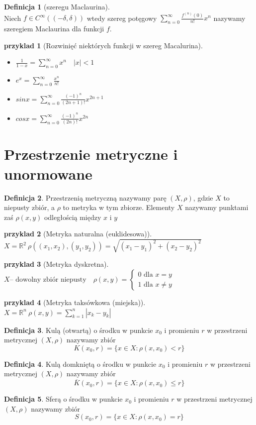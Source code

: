 \documentclass[12pt,a4paper]{article}
\newtheorem{przyklad}{przyklad}
\theoremstyle{definition}
\newtheorem{df}{Definicja}
\begin{document}
\begin{df}[szeregu Maclaurina]~\\
Niech $f\in C^\infty ((-\delta, \delta))$ wtedy szereg potęgowy $\sum\limits_{n=0}^\infty \frac{f^{(n)}(0)}{n!}x^n$ nazywamy szeregiem Maclaurina dla funkcji $f$.
\end{df}

\begin{przyklad}[Rozwinięć niektórych funkcji w szereg Macalurina]~\\
\begin{itemize}
	\item $\frac{1}{1-x} = \sum\limits_{n=0}^\infty x^n \quad |x| < 1$
	\item $e^x = \sum\limits_{n=0}^\infty \frac{x^n}{n!}$
	\item $sinx = \sum\limits_{n=0}^\infty \frac{(-1)^n}{(2n+1)!}x^{2n+1}$
	\item $cosx = \sum\limits_{n=0}^\infty \frac{(-1)^n}{(2n)!}x^{2n}$
\end{itemize}
\end{przyklad}

\section{Przestrzenie metryczne i unormowane}
\begin{df}
Przestrzenią metryczną nazywamy parę $(X, \rho)$, gdzie $X$ to niepusty zbiór, a $\rho$ to metryka w tym zbiorze. Elementy $X$ nazywamy punktami zaś $\rho (x,y)$ odległością między $x$ i $y$ 
\end{df}
\begin{przyklad}[Metryka naturalna (euklidesowa)]
$X = \mathbb{R}^2 ~\rho((x_1,x_2),(y_1, y_2)) = \sqrt{(x_1-y_1)^2+(x_2-y_2)^2}$
\end{przyklad}
\begin{przyklad}[Metryka dyskretna]
$X \text{-- dowolny zbiór niepusty} \quad \rho(x,y) = 
\begin{cases}
0 \text{ dla } x = y\\
1 \text{ dla } x \neq y
\end{cases}$
\end{przyklad}
\begin{przyklad}[Metryka taksówkowa (miejska)]
$X = \mathbb{R}^n ~\rho(x, y) = \sum\limits_{k=1}^n |x_k-y_k|$
\end{przyklad}

\begin{df}
Kulą (otwartą) o środku w punkcie $x_0$ i promieniu $r$ w przestrzeni metrycznej $(X, \rho)$ nazywamy zbiór $$K(x_0, r) = \{x\in X: \rho(x,x_0) < r\}$$
\end{df}
\begin{df}
Kulą domkniętą o środku w punkcie $x_0$ i promieniu $r$ w przestrzeni metrycznej $(X, \rho)$ nazywamy zbiór $$\overline{K}(x_0, r) = \{x\in X: \rho(x,x_0) \leqslant r\}$$
\end{df}
\begin{df}
Sferą o środku w punkcie $x_0$ i promieniu $r$ w przestrzeni metrycznej $(X, \rho)$ nazywamy zbiór $$S(x_0, r) = \{x\in X: \rho(x,x_0) = r\}$$
\end{df}
\end{document}
